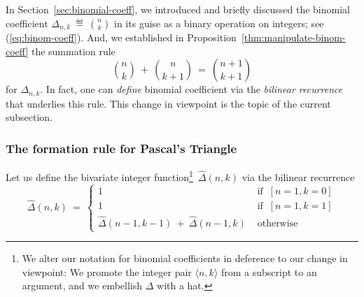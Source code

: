 In Section~\ref{sec:binomial-coeff}, we introduced and briefly
discussed the binomial coefficient 
$\displaystyle \Delta_{n,k} \ \eqdef \ {n \choose k}$ in its guise as a
binary operation on integers; see (\ref{eq:binom-coeff}).  And, we
established in Proposition~\ref{thm:manipulate-binom-coeff} the
summation rule
\[ {n \choose k} \ + \ {n \choose {k+1}} \ = \ {{n+1} \choose {k+1}} \]
for $\Delta_{n,k}$.  In fact, one can {\em define} binomial
coefficient via the {\em bilinear recurrence} that underlies this
rule.  This change in viewpoint is the topic of the current
subsection.

\subsubsection{The formation rule for Pascal's Triangle}
\label{sec:Pascal-formation}

Let us define the bivariate integer function\footnote{We alter our
  notation for binomial coefficients in deference to our change in
  viewpoint: We promote the integer pair $\langle n,k \rangle$ from a
  subscript to an argument, and we embellish $\Delta$ with a
  hat.}~$\hat{\Delta}(n,k)$ via the bilinear recurrence
\begin{equation}
\label{eq:binom-coeff-recurrence}
\hat{\Delta}(n,k) \ = \ 
\left\{
\begin{array}{cl}
1  & \mbox{ if } \ [n=1, k=0] \\
1  & \mbox{ if } \ [n=1, k=1] \\
\hat{\Delta}(n-1, k-1) \ + \  \hat{\Delta}(n-1,k) & \mbox{ otherwise}
\end{array}
\right.
\end{equation}

\smallskip

